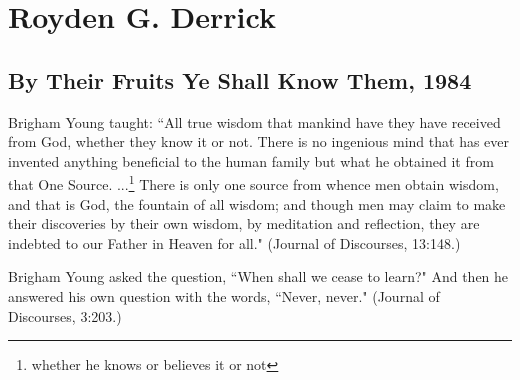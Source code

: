 \section{Royden G. Derrick}

\subsection{By Their Fruits Ye Shall Know Them, 1984}

Brigham Young taught: ``All true wisdom that mankind have they have received from God, whether they know it or not. There is no ingenious mind that has ever invented anything beneficial to the human family but what he obtained it from that One Source. ...\footnote{whether he knows or believes it or not} There is only one source from whence men obtain wisdom, and that is God, the fountain of all wisdom; and though men may claim to make their discoveries by their own wisdom, by meditation and reflection, they are indebted to our Father in Heaven for all." (Journal of Discourses, 13:148.)

Brigham Young asked the question, ``When shall we cease to learn?" And then he answered his own question with the words, ``Never, never." (Journal of Discourses, 3:203.)